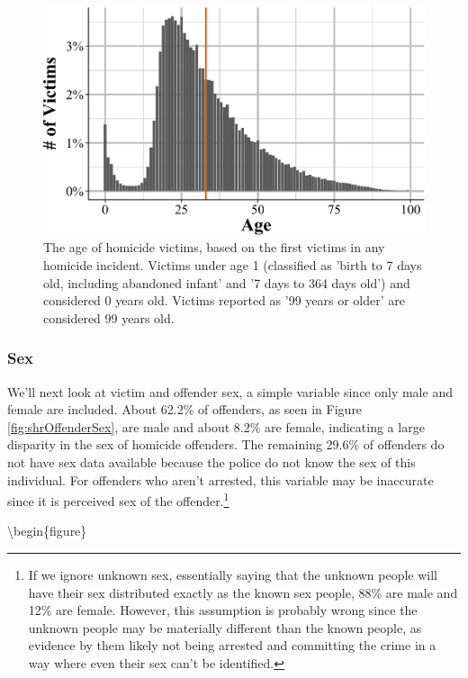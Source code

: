 \documentclass[
  12pt,
  openany]{book}
\begin{document}
\begin{figure}

{\centering \includegraphics[width=0.9\linewidth]{06_shr_files/figure-latex/shrVictimAge-1} 

}

\caption{The age of homicide victims, based on the first victims in any homicide incident. Victims under age 1 (classified as 'birth to 7 days old, including abandoned infant' and '7 days to 364 days old') and considered 0 years old. Victims reported as '99 years or older' are considered 99 years old.}\label{fig:shrVictimAge}
\end{figure}

\subsubsection{Sex}\label{sex}

We'll next look at victim and offender sex, a simple variable since only male and female are included. About 62.2\% of offenders, as seen in Figure \ref{fig:shrOffenderSex}, are male and about 8.2\% are female, indicating a large disparity in the sex of homicide offenders. The remaining 29.6\% of offenders do not have sex data available because the police do not know the sex of this individual. For offenders who aren't arrested, this variable may be inaccurate since it is perceived sex of the offender.\footnote{If we ignore unknown sex, essentially saying that the unknown people will have their sex distributed exactly as the known sex people, 88\% are male and 12\% are female. However, this assumption is probably wrong since the unknown people may be materially different than the known people, as evidence by them likely not being arrested and committing the crime in a way where even their sex can't be identified.}

\textbackslash begin\{figure\}
\end{document}
